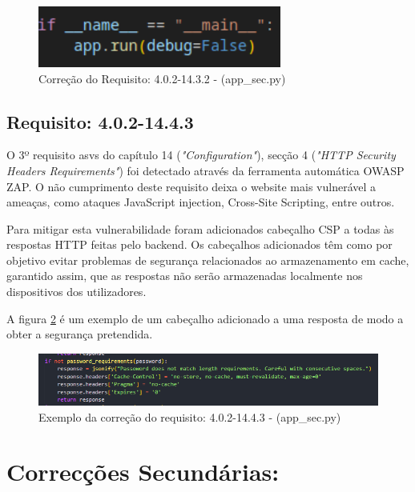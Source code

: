 \begin{figure}[H]
      \centering
      \includegraphics[width=8cm]{images/14_3_2.png}
      \caption{Correção do Requisito: 4.0.2-14.3.2 - (app\_sec.py)}
      \label{fig:det14_3_2}
\end{figure}


\subsection*{Requisito: 4.0.2-14.4.3}
O 3º requisito \ac{asvs} do capítulo 14 (\textit{"Configuration"}), secção 4  (\textit{"HTTP Security Headers Requirements"}) foi detectado através da ferramenta automática OWASP ZAP.
O não cumprimento deste requisito deixa o website mais vulnerável a ameaças, como ataques JavaScript injection, Cross-Site Scripting, entre outros.

Para mitigar esta vulnerabilidade foram adicionados cabeçalho CSP a todas às respostas HTTP feitas pelo backend. Os cabeçalhos adicionados têm como por objetivo evitar problemas de segurança relacionados ao armazenamento em cache, garantido assim, que as respostas não serão armazenadas localmente nos dispositivos dos utilizadores.

A figura \ref{fig:exemplo14_4_3} é um exemplo de um cabeçalho adicionado a uma resposta de modo a obter a segurança pretendida.


\begin{figure}[H]
      \centering
      \includegraphics[width=14cm]{images/exemplo14_4_3.png}
      \caption{Exemplo da correção do requisito: 4.0.2-14.4.3 - (app\_sec.py)}
      \label{fig:exemplo14_4_3}
\end{figure}




\section{Correcções Secundárias:}


